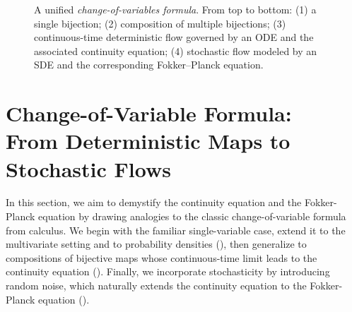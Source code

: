 \begin{figure}[ht!]
{
}
\caption{A unified \emph{change-of-variables formula}. From top to bottom: (1) a single bijection; (2) composition of multiple bijections; (3) continuous-time deterministic flow governed by an ODE and the associated continuity equation; (4) stochastic flow modeled by an SDE and the corresponding Fokker–Planck equation. }
\label{fig:unified_framework_CoV}
\end{figure}

\newpage

\section{Change-of-Variable Formula: \\From Deterministic Maps to Stochastic Flows}\label{sec:cov}

In this section, we aim to demystify the continuity equation and the Fokker-Planck equation by drawing analogies to the classic change-of-variable formula from calculus. We begin with the familiar single-variable case, extend it to the multivariate setting and to probability densities (), then generalize to compositions of bijective maps whose continuous-time limit leads to the continuity equation (). Finally, we incorporate stochasticity by introducing random noise, which naturally extends the continuity equation to the Fokker-Planck equation ().





